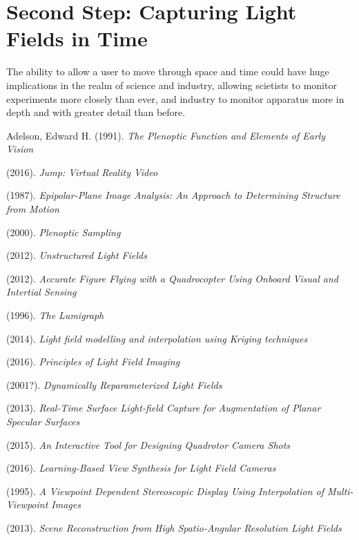 \documentclass[12pt]{report}
\begin{document}
\section{Second Step: Capturing Light Fields in Time}
The ability to allow a user to move through space and time could have huge implications in the realm of science and industry, allowing scietists to monitor experiments more closely than ever, and industry to monitor apparatus more in depth and with greater detail than before.

\begin{thebibliography}{10}%

	Adelson, Edward H. (1991). \emph{The Plenoptic Function and Elements of Early Vision}

	(2016). \emph{Jump: Virtual Reality Video}

	(1987). \emph{Epipolar-Plane Image Analysis: An Approach to Determining Structure from Motion}

	(2000). \emph{Plenoptic Sampling}

	(2012). \emph{Unstructured Light Fields}

	(2012). \emph{Accurate Figure Flying with a Quadrocopter Using Onboard Visual and Intertial Sensing}

	(1996). \emph{The Lumigraph}
	
	(2014). \emph{Light field modelling and interpolation using Kriging techniques}	
	
	(2016). \emph{Principles of Light Field Imaging}	
	
	(2001?). \emph{Dynamically Reparameterized Light Fields}

	(2013). \emph{Real-Time Surface Light-field Capture for Augmentation of Planar Specular Surfaces}
	
	(2015). \emph{An Interactive Tool for Designing Quadrotor Camera Shots}

	(2016). \emph{Learning-Based View Synthesis for Light Field Cameras}

	(1995). \emph{A Viewpoint Dependent Stereoscopic Display Using Interpolation of Multi-Viewpoint Images}
	
	(2013). \emph{Scene Reconstruction from High Spatio-Angular Resolution Light Fields}	
	

\end{thebibliography}
\end{document}
